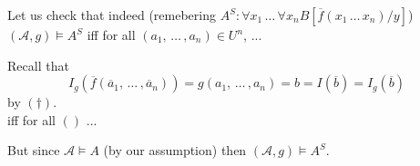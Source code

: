 Let us check that indeed (remebering $A^S: \forall x_1 \, \dots \, \forall x_n B[\overline f (x_1 \, \dots \, x_n)/ y]$) $(\mathcal A, g) \models A^S$ iff for all $(a_1, \, \dots \, , a_n) \in U^n$, %
...

Recall that 
$$I_g(\overline f (\overline a_1, \, \dots \, , \overline a_n)) = g(a_1, \, \dots \, , a_n) = b = I(\overline b) = I_g (\overline b) $$
by $(\dag)$.\\

iff for all $()$ %
...

But since $\mathcal A \models A$ (by our assumption) then $(\mathcal A, g) \models A^S$.\\


